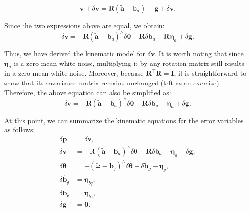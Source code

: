 \begin{equation}\label{key}
	\dot{\mathbf{v}} + \delta \dot{\mathbf{v}} = \mathbf{R}(\tilde{\mathbf{a}} - \mathbf{b}_a) + \mathbf{g} + \delta \dot{\mathbf{v}}.
\end{equation}

Since the two expressions above are equal, we obtain:
\begin{equation}\label{key}
	\delta \dot{\mathbf{v}} = - \mathbf{R}(\tilde{\mathbf{a}} - \mathbf{b}_a)^\wedge \delta \boldsymbol{\theta} - 
	\mathbf{R} \delta \mathbf{b}_a  - \mathbf{R} \boldsymbol{\eta}_a + \delta \mathbf{g}.
\end{equation}

Thus, we have derived the kinematic model for $\delta \mathbf{v}$. It is worth noting that since $\boldsymbol{\eta}_a$ is a zero-mean white noise, multiplying it by any rotation matrix still results in a zero-mean white noise. Moreover, because $\mathbf{R}^\top \mathbf{R} = \mathbf{I}$, it is straightforward to show that its covariance matrix remains unchanged (left as an exercise). Therefore, the above equation can also be simplified as:
\begin{equation}\label{key}
	\delta \dot{\mathbf{v}} = - \mathbf{R}(\tilde{\mathbf{a}} - \mathbf{b}_a)^\wedge \delta \boldsymbol{\theta} - 
	\mathbf{R} \delta \mathbf{b}_a  - \boldsymbol{\eta}_a + \delta \mathbf{g}.
\end{equation}

At this point, we can summarize the kinematic equations for the error variables as follows:
\begin{subequations}\label{eq:eskf-error-state-continuous-time}
	\begin{align}
		\delta \dot{\mathbf{p}} &= \delta \mathbf{v}, \\
		\delta \dot{\mathbf{v}} &= - \mathbf{R}(\tilde{\mathbf{a}} - \mathbf{b}_a)^\wedge \delta \boldsymbol{\theta} - 
		\mathbf{R} \delta \mathbf{b}_a  - \boldsymbol{\eta}_a + \delta \mathbf{g}, \\
		\delta \dot{\boldsymbol{\theta}} &= -(\tilde{\boldsymbol{\omega}} - \mathbf{b}_g)^\wedge \delta 
		\boldsymbol{\theta} - \delta \mathbf{b}_g - \boldsymbol{\eta}_g, \\
		\delta \dot{\mathbf{b}_g} &= \boldsymbol{\eta}_{bg}, \\
		\delta \dot{\mathbf{b}_a} &= \boldsymbol{\eta}_{ba}, \\
		\delta \dot{\mathbf{g}} &= \mathbf{0} .
	\end{align}
\end{subequations}
